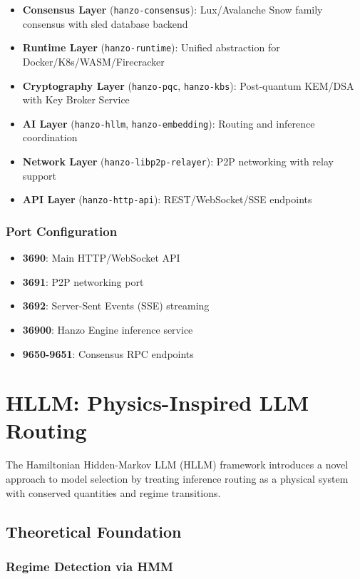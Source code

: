 \documentclass[11pt,twocolumn]{article}
\begin{document}
\begin{itemize}
\item \textbf{Consensus Layer} (\texttt{hanzo-consensus}): Lux/Avalanche Snow family consensus with sled database backend
\item \textbf{Runtime Layer} (\texttt{hanzo-runtime}): Unified abstraction for Docker/K8s/WASM/Firecracker
\item \textbf{Cryptography Layer} (\texttt{hanzo-pqc}, \texttt{hanzo-kbs}): Post-quantum KEM/DSA with Key Broker Service
\item \textbf{AI Layer} (\texttt{hanzo-hllm}, \texttt{hanzo-embedding}): Routing and inference coordination
\item \textbf{Network Layer} (\texttt{hanzo-libp2p-relayer}): P2P networking with relay support
\item \textbf{API Layer} (\texttt{hanzo-http-api}): REST/WebSocket/SSE endpoints
\end{itemize}

\subsubsection{Port Configuration}

\begin{itemize}
\item \textbf{3690}: Main HTTP/WebSocket API
\item \textbf{3691}: P2P networking port
\item \textbf{3692}: Server-Sent Events (SSE) streaming
\item \textbf{36900}: Hanzo Engine inference service
\item \textbf{9650-9651}: Consensus RPC endpoints
\end{itemize}

\section{HLLM: Physics-Inspired LLM Routing}

The Hamiltonian Hidden-Markov LLM (HLLM) framework introduces a novel approach to model selection by treating inference routing as a physical system with conserved quantities and regime transitions.

\subsection{Theoretical Foundation}

\subsubsection{Regime Detection via HMM}
\end{document}
